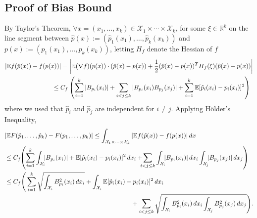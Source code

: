 \documentclass{article} %
\newcommand{\R}{\mathbb{R}}                         %
\newcommand{\X}{\mathcal{X}}                        %
\newcommand{\E}{\mathbb{E}}                         %
\begin{document}
\subsection{Proof of Bias Bound}
By Taylor's Theorem,
$\forall x = (x_1,\dots,x_k) \in \X_1\times\cdots\times\X_k$, for some
$\xi \in \R^k$ on the line segment between
$\hat p(x) := (\hat p_1(x_1),\dots,\hat p_k(x_k))$ and
$p(x) := (p_1(x_1),\dots,p_k(x_k))$, letting $H_f$ denote the Hessian of $f$
\begin{align*}
|\E f(\hat p(x)) - f(p(x))|
 &  = \left| \E (\nabla f)(p(x))
        \cdot \left( \hat p(x) - p(x) \right)
    + \frac12 (\hat p(x) - p(x))^TH_f(\xi)(\hat p(x) - p(x)) \right|    \\
 &  \hspace{-5mm}
    \leq C_f \left( \sum_{i = 1}^k |B_{p_i}(x_i)|
                    + \sum_{i < j \leq k} |B_{p_i}(x_i)B_{p_j}(x_j)|
                    + \sum_{i = 1}^k \E[\hat p_i(x_i) - p_i(x_i)]^2
    \right)
\end{align*}
where we used that $\hat p_i$ and $\hat p_j$ are independent for $i \neq j$.
Applying H\"older's Inequality,
\begin{align*}
 & |\E F(\hat p_1,\dots,\hat p_k) - F(p_1,\dots,p_k)|
    \leq \int_{\X_1\times\cdots\times\X_k} |\E f(\hat p(x)) - f(p(x))| \, dx \\
 &  \leq C_f\hspace{-1mm}
            \left( \sum_{i = 1}^k \int_{\X_i} \hspace{-1.5mm}|B_{p_i}(x_i)|
                                    + \E[\hat p_i(x_i) - p_i(x_i)]^2 \, dx_i
                    + \hspace{-2mm}\sum_{i < j \leq k}
                    \int_{\X_i} \hspace{-1.5mm}|B_{p_i}(x_i)| \, dx_i
                    \int_{\X_j} \hspace{-1.5mm}|B_{p_j}(x_j)| \, dx_j
            \right) \\
 &  \leq C_f
            \Bigg( \sum_{i = 1}^k \sqrt{\int_{\X_i} B_{p_i}^2(x_i) \, dx_i}
                        + \int_{\X_i} \E[\hat p_i(x_i) - p_i(x_i)]^2 \, dx_i \\
 & \hspace{70mm}    + \sum_{i < j \leq k}
                    \sqrt{\int_{\X_i} B_{p_i}^2(x_i) \, dx_i
                    \int_{\X_j} B_{p_j}^2(x_j) \, dx_j}
            \Bigg).
\end{align*}
\end{document}
